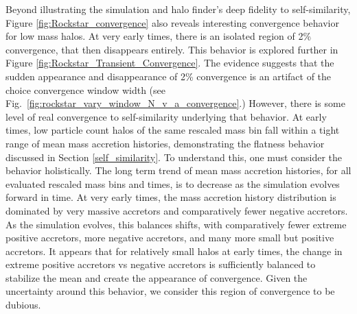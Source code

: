 Beyond illustrating the simulation and halo finder's deep fidelity to self-similarity, Figure \ref{fig:Rockstar_convergence} also reveals interesting convergence behavior for low mass halos. At very early times, there is an isolated region of 2\% convergence, that then disappears entirely. This behavior is explored further in Figure \ref{fig:Rockstar_Transient_Convergence}. The evidence suggests that the sudden appearance and disappearance of 2\% convergence is an artifact of the choice convergence window width (see Fig.~\ref{fig:rockstar_vary_window_N_v_a_convergence}.) However, there is some level of real convergence to self-similarity underlying that behavior. At early times, low particle count halos of the same rescaled mass bin fall within a tight range of mean mass accretion histories, demonstrating the flatness behavior discussed in Section \ref{self_similarity}. To understand this, one must consider the behavior holistically. The long term trend of mean mass accretion histories, for all evaluated rescaled mass bins and times, is to decrease as the simulation evolves forward in time. At very early times, the mass accretion history distribution is dominated by very massive accretors and comparatively fewer negative accretors. As the simulation evolves, this balances shifts, with comparatively fewer extreme positive accretors, more negative accretors, and many more small but positive accretors. It appears that for relatively small halos at early times, the change in extreme positive accretors vs negative accretors is sufficiently balanced to stabilize the mean and create the appearance of convergence. Given the uncertainty around this behavior, we consider this region of convergence to be dubious.

